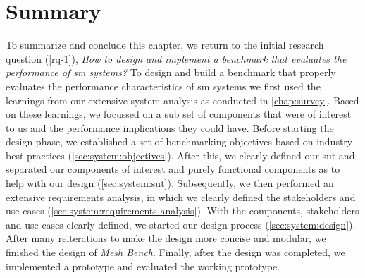 \section{Summary}
\label{sec:system:summary}

To summarize and conclude this chapter, we return to the initial research question (\ref{rq-1}), \textit{How to design and implement a benchmark that evaluates the performance of \gls{sm} systems?} To design and build a benchmark that properly evaluates the performance characteristics of \gls{sm} systems we first used the learnings from our extensive system analysis as conducted in \cref{chap:survey}. Based on these learnings, we focussed on a sub set of components that were of interest to us and the performance implications they could have. Before starting the design phase, we established a set of benchmarking objectives based on industry best practices (\cref{sec:system:objectives}). After this, we clearly defined our \gls{sut} and separated our components of interest and purely functional components as to help with our design (\cref{sec:system:sut}). Subsequently, we then performed an extensive requirements analysis, in which we clearly defined the stakeholders and use cases (\cref{sec:system:requirements-analysis}). With the components, stakeholders and use cases clearly defined, we started our design process (\cref{sec:system:design}). After many reiterations to make the design more concise and modular, we finished the design of \textit{Mesh Bench}. Finally, after the design was completed, we implemented a prototype and evaluated the working prototype.

